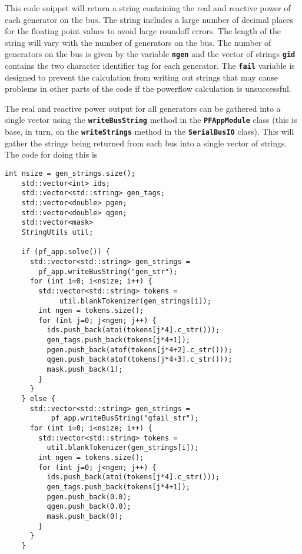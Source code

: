 This code snippet will return a string containing the real and reactive power of each generator on the bus. The string includes a large number of decimal places for the floating point values to avoid large roundoff errors. The length of the string will vary with the number of generators on the bus. The number of generators on the bus is given by the variable \texttt{\textbf{ngen}} and the vector of strings \texttt{\textbf{gid}} contains the two character identifier tag for each generator. The \texttt{\textbf{fail}} variable is designed to prevent the calculation from writing out strings that may cause problems in other parts of the code if the powerflow calculation is unsuccessful.

The real and reactive power output for all generators can be gathered into a
single vector using the \texttt{\textbf{writeBusString}} method in the
\texttt{\textbf{PFAppModule}} class (this is base, in turn, on the
\texttt{\textbf{writeStrings}} method in the \texttt{\textbf{SerialBusIO}}
class). This will gather the strings being returned from each bus into a single vector of strings. The code for doing this is

{
\color{red}
\begin{Verbatim}[fontseries=b]
    int nsize = gen_strings.size();
    std::vector<int> ids;
    std::vector<std::string> gen_tags;
    std::vector<double> pgen;
    std::vector<double> qgen;
    std::vector<mask>
    StringUtils util;

    if (pf_app.solve()) {
      std::vector<std::string> gen_strings =
        pf_app.writeBusString("gen_str");
      for (int i=0; i<nsize; i++) {
        std::vector<std::string> tokens =
             util.blankTokenizer(gen_strings[i]);
        int ngen = tokens.size();
        for (int j=0; j<ngen; j++) {
          ids.push_back(atoi(tokens[j*4].c_str()));
          gen_tags.push_back(tokens[j*4+1]);
          pgen.push_back(atof(tokens[j*4+2].c_str()));
          qgen.push_back(atof(tokens[j*4+3].c_str()));
          mask.push_back(1);
        }
      }
    } else {
      std::vector<std::string> gen_strings =
           pf_app.writeBusString("gfail_str");
      for (int i=0; i<nsize; i++) {
        std::vector<std::string> tokens =
          util.blankTokenizer(gen_strings[i]);
        int ngen = tokens.size();
        for (int j=0; j<ngen; j++) {
          ids.push_back(atoi(tokens[j*4].c_str()));
          gen_tags.push_back(tokens[j*4+1]);
          pgen.push_back(0.0);
          qgen.push_back(0.0);
          mask.push_back(0);
        }
      }
    }
\end{Verbatim}
}

